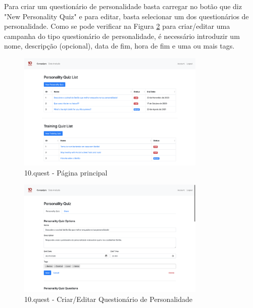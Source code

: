 Para criar um questionário de personalidade basta carregar no botão que diz "New Personality Quiz" e para editar, basta selecionar um dos questionários de personalidade. Como se pode verificar na Figura \ref{fig:pq} para criar/editar uma campanha do tipo questionário de personalidade, é necessário introduzir um nome, descripção (opcional), data de fim, hora de fim e uma ou mais tags.

\begin{figure}[ht!]
	\begin{center}
		\includegraphics[width=0.8\textwidth]{img/product/homepage}
		\caption{10.quest - Página principal}
		\label{fig:home}
	\end{center}
\end{figure}

\begin{figure}[ht!]
	\begin{center}
		\includegraphics[width=0.8\textwidth]{img/product/pq}
		\caption{10.quest - Criar/Editar Questionário de Personalidade}
		\label{fig:pq}
	\end{center}
\end{figure}
\newpage



